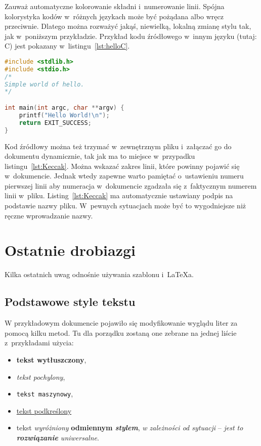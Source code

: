 Zauważ automatyczne kolorowanie składni i~numerowanie linii. Spójna kolorystyka kodów w~różnych językach może być pożądana albo wręcz przeciwnie. Dlatego można rozważyć jakąś, niewielką, lokalną zmianę stylu tak, jak w~poniższym przykładzie. Przykład kodu źródłowego w~innym języku (tutaj: C) jest pokazany w~listingu~\ref{lst:helloC}. 

\begin{lstlisting}[language=C,
    backgroundcolor=\color{EEGold!5!white},
    caption={Prosty program w~języku C},
    label={lst:helloC}]
#include <stdlib.h>
#include <stdio.h>
/* 
Simple world of hello.
*/

int main(int argc, char **argv) {
	printf("Hello World!\n");
	return EXIT_SUCCESS;
}
\end{lstlisting}

Kod źródłowy można też trzymać w~zewnętrznym pliku i~załączać go do dokumentu dynamicznie, tak jak ma to miejsce w~przypadku listingu~\ref{lst:Keccak}. Można wskazać zakres linii, które powinny pojawić się w~dokumencie. Jednak wtedy zapewne warto pamiętać o~ustawieniu numeru pierwszej linii aby numeracja w~dokumencie zgadzała się z~faktycznym numerem linii w~pliku. Listing~\ref{lst:Keccak} ma automatycznie ustawiany podpis na podstawie nazwy pliku. W~pewnych sytuacjach może być to wygodniejsze niż ręczne wprowadzanie nazwy.



\section{Ostatnie drobiazgi}
Kilka ostatnich uwag odnośnie używania szablonu i~\LaTeX{a}.

\subsection{Podstawowe style tekstu}
W przykładowym dokumencie pojawiło się modyfikowanie wyglądu liter za pomocą kilku metod. Tu dla porządku zostaną one zebrane na jednej liście z~przykładami użycia:
\begin{itemize}
    \item \textbf{tekst wytłuszczony},
    \item \textit{tekst pochylony},
    \item \texttt{tekst maszynowy},
    \item \underline{tekst podkreślony}
    \item tekst \emph{wyróżniony} \textbf{odmiennym \emph{stylem}}, \textit{w zależności \emph{od sytuacji}} -- \emph{jest to \textbf{rozwiązanie} \textit{uniwersalne}}.
\end{itemize}

